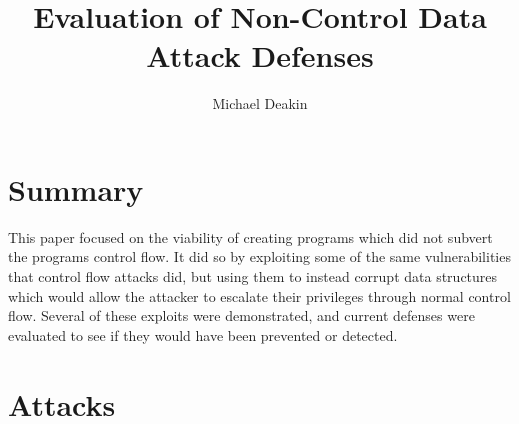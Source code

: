 \documentclass{article}
\title{Evaluation of Non-Control Data Attack Defenses}
\author{Michael Deakin}
\begin{document}
\maketitle
\section{Summary}
This paper focused on the viability of creating programs which did not subvert the programs control flow.
It did so by exploiting some of the same vulnerabilities that control flow attacks did, but using them to instead corrupt data structures which would allow the attacker to escalate their privileges through normal control flow.
Several of these exploits were demonstrated, and current defenses were evaluated to see if they would have been prevented or detected.

\section{Attacks}
\end{document}
